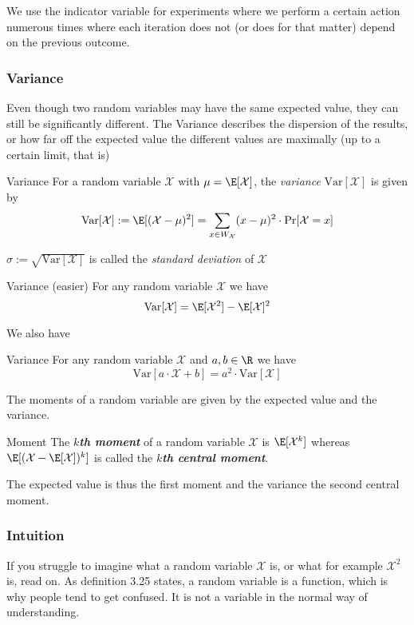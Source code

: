  We use the indicator variable for experiments where we perform a certain action numerous times where each iteration does not (or does for that matter) depend on the previous outcome.


\newpage
\subsubsection{Variance}
Even though two random variables may have the same expected value, they can still be significantly different. The Variance describes the dispersion of the results, or how far off the expected value the different values are maximally (up to a certain limit, that is)

\setcounter{all}{39}
\begin{definition}[]{Variance}
    For a random variable $\mathcal{X}$ with $\mu = \E[\mathcal{X}]$, the \textit{variance} $\text{Var}[\mathcal{X}]$ is given by
    \begin{align*}
        \text{Var}[\mathcal{X}] := \E[(\mathcal{X} - \mu)^2] = \sum_{x \in W_{\mathcal{X}}} (x - \mu)^2 \cdot \Pr[\mathcal{X} = x]
    \end{align*}

    $\sigma := \sqrt{\text{Var}[\mathcal{X}]}$ is called the \textit{standard deviation} of $\mathcal{X}$
\end{definition}

\begin{theorem}[]{Variance (easier)}
    For any random variable $\mathcal{X}$ we have
    \[
        \text{Var}[\mathcal{X}] = \E[\mathcal{X}^2] - \E[\mathcal{X}]^2
    \]
\end{theorem}
We also have
\begin{theorem}[]{Variance}
    For any random variable $\mathcal{X}$ and $a, b \in \R$ we have
    \[
        \text{Var}[a \cdot \mathcal{X} + b] = a^2 \cdot \text{Var}[\mathcal{X}]
    \]
\end{theorem}
The moments of a random variable are given by the expected value and the variance.
\begin{definition}[]{Moment}
    The \textbf{\textit{$k$th moment}} of a random variable $\mathcal{X}$ is $\E[\mathcal{X}^k]$ whereas $\E[(\mathcal{X} - \E[\mathcal{X}])^k]$ is called the \textbf{\textit{$k$th central moment}}.
\end{definition}
 The expected value is thus the first moment and the variance the second central moment.


\subsubsection{Intuition}
\label{sec:random-var-details}
If you struggle to imagine what a random variable $\mathcal{X}$ is, or what for example $\mathcal{X}^2$ is, read on. 
As definition 3.25 states, a random variable is a function, which is why people tend to get confused. 
It is not a variable in the normal way of understanding. 

